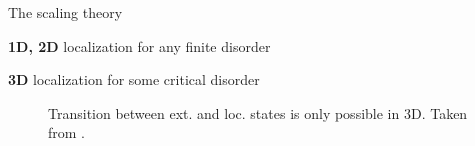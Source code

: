 \documentclass[1pt]{beamer}
\begin{document}
\begin{frame}{The scaling theory}
\begin{minipage}[c]{0.36\textwidth}
\begin{alertblock}{\centering\textbf{1D, 2D}}
\centering localization for any finite disorder
\end{alertblock}\vspace{0.65cm}
\begin{alertblock}{\centering\textbf{3D}}
\centering localization for some critical disorder
\end{alertblock}\vspace{0.35cm}
\end{minipage}\hfill
\begin{minipage}[c]{0.6\textwidth}
\vspace{5mm}
\begin{figure}
\caption{Transition between ext. and loc. states is only possible in 3D. Taken from \cite{50yearsof}.}
\end{figure}
\end{minipage}
\end{frame}
\end{document}
